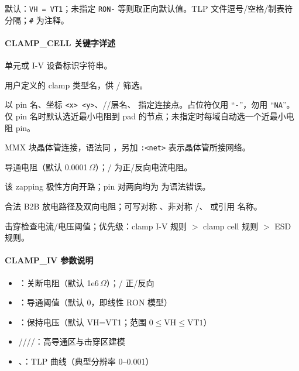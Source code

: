 默认：\texttt{VH = VT1}；未指定 \texttt{RON-} 等则取正向默认值。TLP 文件逗号/空格/制表符分隔；\texttt{\#} 为注释。

\paragraph{CLAMP\_CELL 关键字详述}
\begin{description}[leftmargin=2.8cm,style=nextline]
\item[\kw{NAME}] 单元或 I-V 设备标识字符串。
\item[\kw{TYPE}] 用户定义的 clamp 类型名，供 / 筛选。
\item[\kw{PIN}] 以 pin 名、坐标 \texttt{<x> <y>}、//层名、 指定连接点。占位符仅用 ``\texttt{-}''，勿用 ``\texttt{NA}''。仅 pin 名时默认选近最小电阻到 pad 的节点；未指定时每域自动选一个近最小电阻 pin。
\item[\kw{XTOR}] MMX 块晶体管连接，语法同 ，另加 \texttt{:<net>} 表示晶体管所接网络。
\item[\kw{RON}] 导通电阻（默认 0.0001\,$\Omega$）；/ 为正/反向电流电阻。
\item[\kw{OFF}] 该 zapping 极性方向开路；pin 对两向均为  为语法错误。
\item[\kw{ESD_PIN_PAIR}] 合法 B2B 放电路径及双向电阻；可写对称 、非对称 /、 或引用  名称。
\item[\kw{IMAX}/\kw{VMAX}] 击穿检查电流/电压阈值；优先级：clamp I-V 规则 $>$ clamp cell 规则 $>$ ESD 规则。
\end{description}

\paragraph{CLAMP\_IV 参数说明}
\begin{itemize}
  \item {}：关断电阻（默认 1e6\,$\Omega$）；/ 正/反向
  \item {}：导通阈值（默认 0，即线性 RON 模型）
  \item {}：保持电压（默认 VH=VT1；范围 $0 \le \mathrm{VH} \le \mathrm{VT1}$）
  \item {}////：高导通区与击穿区建模
  \item {}、：TLP 曲线（典型分辨率 0--0.001）
\end{itemize}

